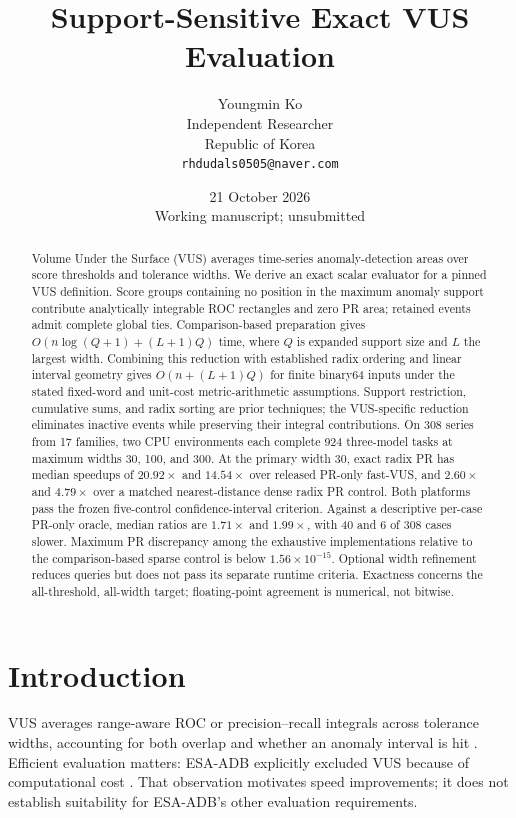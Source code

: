 \documentclass[10pt]{article}
\title{Support-Sensitive Exact VUS Evaluation}
\author{Youngmin Ko\\Independent Researcher\\Republic of Korea\\\texttt{rhdudals0505@naver.com}}
\date{21 October 2026\\\small Working manuscript; unsubmitted}
\begin{document}
\maketitle
\begin{abstract}
Volume Under the Surface (VUS) averages time-series anomaly-detection areas
over score thresholds and tolerance widths. We derive an exact scalar
evaluator for a pinned VUS definition. Score groups containing no position
in the maximum anomaly support contribute analytically integrable ROC
rectangles and zero PR area; retained events admit complete global ties.
Comparison-based preparation gives $O(n\log(Q+1)+(L+1)Q)$ time, where $Q$
is expanded support size and $L$ the largest width. Combining this reduction
with established radix ordering and linear interval geometry gives
$O(n+(L+1)Q)$ for finite binary64 inputs under the stated fixed-word and
unit-cost metric-arithmetic assumptions. Support restriction, cumulative
sums, and radix sorting are prior techniques; the VUS-specific reduction
eliminates inactive events while preserving their integral contributions.
On 308 series from 17 families, two CPU environments each complete 924
three-model tasks at maximum widths 30, 100, and 300. At the primary width
30, exact radix PR has median speedups of $20.92\times$ and $14.54\times$
over released PR-only fast-VUS, and $2.60\times$ and $4.79\times$ over a
matched nearest-distance dense radix PR control. Both platforms pass the
frozen five-control confidence-interval criterion. Against a descriptive
per-case PR-only oracle, median ratios are $1.71\times$ and $1.99\times$,
with 40 and 6 of 308 cases slower. Maximum PR discrepancy among the
exhaustive implementations relative to the comparison-based sparse control
is below $1.56\times10^{-15}$. Optional width refinement reduces queries but does
not pass its separate runtime criteria. Exactness concerns the
all-threshold, all-width target; floating-point agreement is numerical,
not bitwise.
\end{abstract}

\section{Introduction}
VUS averages range-aware ROC or precision--recall integrals across tolerance
widths, accounting for both overlap and whether an anomaly interval is hit
\cite{paparrizos2022,boniol2025}. Efficient evaluation matters: ESA-ADB explicitly
excluded VUS because of computational cost \cite{esa2024}. That observation
motivates speed improvements; it does not establish suitability for ESA-ADB's
other evaluation requirements.
\end{document}
